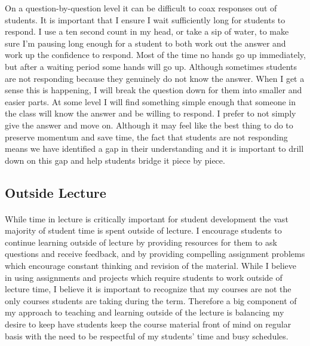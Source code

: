 \documentclass{article}
\begin{document}
On a question-by-question level it can be difficult to coax responses out of students. It is important that I ensure I wait sufficiently long for students to respond. I use a ten second count in my head, or take a sip of water, to make sure I'm pausing long enough for a student to both work out the answer and work up the confidence to respond. Most of the time no hands go up immediately, but after a waiting period some hands will go up. Although sometimes students are not responding because they genuinely do not know the answer. When I get a sense this is happening, I will break the question down for them into smaller and easier parts. At some level I will find something simple enough that someone in the class will know the answer and be willing to respond. I prefer to not simply give the answer and move on. Although it may feel like the best thing to do to preserve momentum and save time, the fact that students are not responding means we have identified a gap in their understanding and it is important to drill down on this gap and help students bridge it piece by piece.

\subsection{Outside Lecture}
\paragraph{}
While time in lecture is critically important for student development the vast majority of student time is spent outside of lecture. I encourage students to continue learning outside of lecture by providing resources for them to ask questions and receive feedback, and by providing compelling assignment problems which encourage constant thinking and revision of the material. While I believe in using assignments and projects which require students to work outside of lecture time, I believe it is important to recognize that my courses are not the only courses students are taking during the term. Therefore a big component of my approach to teaching and learning outside of the lecture is balancing my desire to keep have students keep the course material front of mind on regular basis with the need to be respectful of my students' time and busy schedules.
\end{document}
